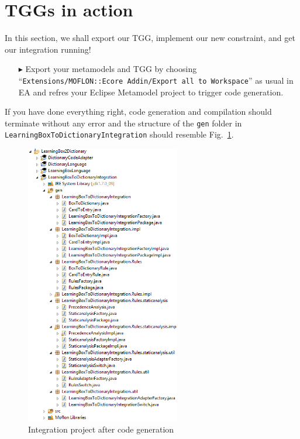 \section{TGGs in action}
\label{sect:TGGs_in_Action}
In this section, we shall export our TGG, implement our new constraint, and get our integration running!

\begin{enumerate}
\item[$\blacktriangleright$] Export your metamodels and TGG by choosing ``\texttt{Extensions/\-MOFLON::\-Ecore Addin\-/Export all to Workspace}'' as usual in EA and refres your Eclipse Metamodel project to trigger code generation.
\end{enumerate}

If you have done everything right, code generation and compilation should terminate without any error and the structure of the \texttt{gen} folder in \texttt{LearningBox\-To\-Dictionary\-Integration} should resemble Fig.~\ref{fig:gen_folder}.

\begin{figure}[htbp]
\begin{center}
  \includegraphics[width=0.6\textwidth]{pics/tggBilder/transformation/tgg22}
  \caption{Integration project after code generation}
  \label{fig:gen_folder}
\end{center}
\end{figure}

